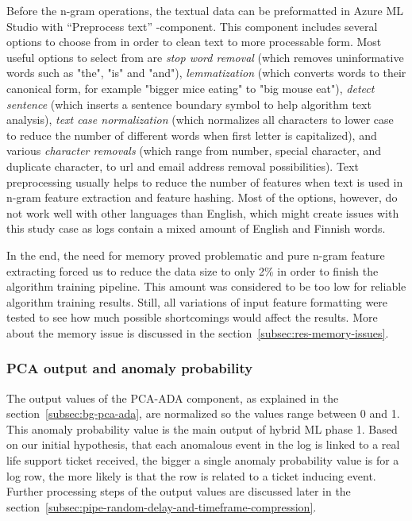 
Before the n-gram operations,
the textual data can be preformatted in Azure ML Studio
with \enquote{Preprocess text} -component.
This component includes several options to choose from
in order to clean text to more processable form.
Most useful options to select from are
\textit{stop word removal} (which removes uninformative words such as "the", "is" and "and"),
\textit{lemmatization} (which converts words to their canonical form,
for example "bigger mice eating" to "big mouse eat"),
\textit{detect sentence} (which inserts a sentence boundary symbol
to help algorithm text analysis),
\textit{text case normalization} (which normalizes all characters to lower case
to reduce the number of different words when first letter is capitalized),
and various \textit{character removals} (which range from number, special character, and duplicate character,
to url and email address removal possibilities).
Text preprocessing usually helps to reduce the number of features
when text is used in n-gram feature extraction and feature hashing.
Most of the options, however,
do not work well with other languages than English,
which might create issues with this study case
as logs contain a mixed amount of English and Finnish words.~\cite{azure2021preprocess}

In the end,
the need for memory proved problematic
and pure n-gram feature extracting forced us
to reduce the data size to only 2\%
in order to finish the algorithm training pipeline.
This amount was considered to be too low
for reliable algorithm training results.
Still,
all variations of input feature formatting were tested
to see how much possible shortcomings would affect the results.
More about the memory issue is discussed
in the section~\ref{subsec:res-memory-issues}.




\subsubsection*{PCA output and anomaly probability}

The output values of the PCA-ADA component,
as explained in the section~\ref{subsec:bg-pca-ada},
are normalized so the values range between 0 and 1.
This anomaly probability value
is the main output of hybrid ML phase 1.
Based on our initial hypothesis,
that each anomalous event in the log
is linked to a real life support ticket received,
the bigger a single anomaly probability value is for a log row,
the more likely is that the row is related to a ticket inducing event.
Further processing steps of the output values
are discussed later in the section~\ref{subsec:pipe-random-delay-and-timeframe-compression}.

